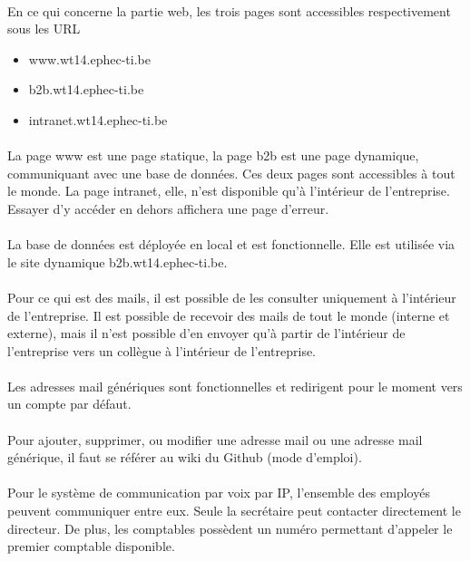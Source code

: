 \documentclass[a4paper,12pt]{article}
\begin{document}
	\paragraph{} En ce qui concerne la partie web, les trois pages sont accessibles respectivement
sous les URL 
\begin{itemize}
	\item www.wt14.ephec-ti.be
	\item b2b.wt14.ephec-ti.be
	\item intranet.wt14.ephec-ti.be
\end{itemize}
	\paragraph{} La page www est une page statique, la page b2b est une page dynamique, communiquant
avec une base de données. Ces deux pages sont accessibles à tout le monde.
La page intranet, elle, n’est disponible qu’à l’intérieur de l’entreprise. Essayer d’y
accéder en dehors affichera une page d’erreur.
	\paragraph{} La base de données est déployée en local et est fonctionnelle. Elle est utilisée via
le site dynamique b2b.wt14.ephec-ti.be.
	\paragraph{} Pour ce qui est des mails, il est possible de les consulter uniquement à l’intérieur
de l’entreprise. Il est possible de recevoir des mails de tout le monde (interne et
externe), mais il n’est possible d’en envoyer qu’à partir de l’intérieur de l’entreprise
vers un collègue à l’intérieur de l’entreprise.
	\paragraph{} Les adresses mail génériques sont fonctionnelles et redirigent pour le moment vers
un compte par défaut.
	\paragraph{} Pour ajouter, supprimer, ou modifier une adresse mail ou une adresse mail générique,
il faut se référer au wiki du Github (mode d’emploi).
	\paragraph{} Pour le système de communication par voix par IP, l’ensemble des employés
peuvent communiquer entre eux. Seule la secrétaire peut contacter directement le
directeur. De plus, les comptables possèdent un numéro permettant d’appeler le
premier comptable disponible.
\end{document}

